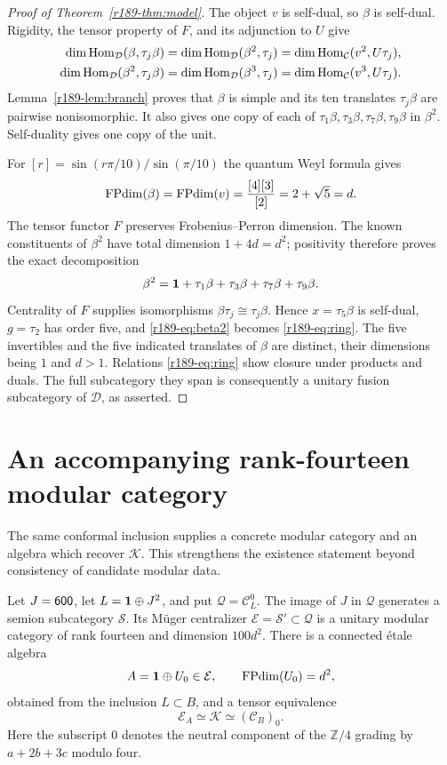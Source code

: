 \begin{proof}[Proof of Theorem~\ref{r189-thm:model}]
The object $v$ is self-dual, so $\beta$ is self-dual. Rigidity, the tensor
property of $F$, and its adjunction to $U$ give
\begin{align*}
 \dim\operatorname{Hom}_{\mathcal{D}}(\beta,\tau_j\beta)
 &=\dim\operatorname{Hom}_{\mathcal{D}}(\beta^2,\tau_j)
 =\dim\operatorname{Hom}_{\mathcal{C}}(v^2,U\tau_j),\\
 \dim\operatorname{Hom}_{\mathcal{D}}(\beta^2,\tau_j\beta)
 &=\dim\operatorname{Hom}_{\mathcal{D}}(\beta^3,\tau_j)
 =\dim\operatorname{Hom}_{\mathcal{C}}(v^3,U\tau_j).
\end{align*}
Lemma~\ref{r189-lem:branch} proves that $\beta$ is simple and its ten
translates $\tau_j\beta$ are pairwise nonisomorphic. It also gives one
copy of each of $\tau_1\beta,\tau_3\beta,\tau_7\beta,\tau_9\beta$ in
$\beta^2$. Self-duality gives one copy of the unit.

For $[r]=\sin(r\pi/10)/\sin(\pi/10)$ the quantum Weyl formula gives
\[
 \operatorname{FPdim}(\beta)=\operatorname{FPdim}(v)=\frac{[4][3]}{[2]}=2+\sqrt5=d.
\]
The tensor functor $F$ preserves Frobenius--Perron dimension. The known
constituents of $\beta^2$ have total dimension $1+4d=d^2$; positivity
therefore proves the exact decomposition
\begin{equation}\label{r189-eq:beta2}
 \beta^2=\mathbf1+\tau_1\beta+\tau_3\beta+\tau_7\beta+\tau_9\beta.
\end{equation}
Centrality of $F$ supplies isomorphisms $\beta\tau_j\cong\tau_j\beta$.
Hence $x=\tau_5\beta$ is self-dual, $g=\tau_2$ has order five, and
\eqref{r189-eq:beta2} becomes \eqref{r189-eq:ring}. The five invertibles and the
five indicated translates of $\beta$ are distinct, their dimensions
being $1$ and $d>1$. Relations \eqref{r189-eq:ring} show closure under
products and duals. The full subcategory they span is consequently a
unitary fusion subcategory of $\mathcal{D}$, as asserted.
\end{proof}

\section{An accompanying rank-fourteen modular category}
\label{r189-sec:fourteen}

The same conformal inclusion supplies a concrete modular category and
an algebra which recover $\mathcal{K}$. This strengthens the existence statement
beyond consistency of candidate modular data.

\begin{proposition}\label{r189-prop:fourteen}
Let $J=\mathsf{600}$, let $L=\mathbf1\oplus J^2$, and put $\mathcal{Q}=\mathcal{C}_L^0$.
The image of $J$ in $\mathcal{Q}$ generates a semion subcategory $\mathcal S$.
Its M\"uger centralizer $\mathcal{E}=\mathcal S'\subset\mathcal{Q}$ is a unitary modular
category of rank fourteen and dimension $100d^2$. There is a connected
\'etale algebra
\[
 A=\mathbf1\oplus U_0\in\mathcal{E},\qquad \operatorname{FPdim}(U_0)=d^2,
\]
obtained from the inclusion $L\subset B$, and a tensor equivalence
\[
 \mathcal{E}_A\simeq\mathcal{K}\simeq(\mathcal{C}_B)_0.
\]
Here the subscript $0$ denotes the neutral component of the
$\mathbb Z/4$ grading by $a+2b+3c$ modulo four.
\end{proposition}

